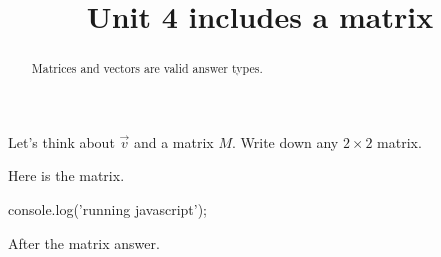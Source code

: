 \documentclass{ximera}
\title{Unit 4 includes a matrix}
\begin{document}
\begin{abstract}
  Matrices and vectors are valid answer types.
\end{abstract}

\begin{exercise}
  Let's think about $\vec{v}$ and a matrix $M$.  Write down any $2
  \times 2$ matrix.

\begin{solution}
  Here is the matrix.

\begin{matrixanswer}
  console.log('running javascript');    
\end{matrixanswer}

After the matrix answer.

\end{solution}

\end{exercise}
\end{document}
